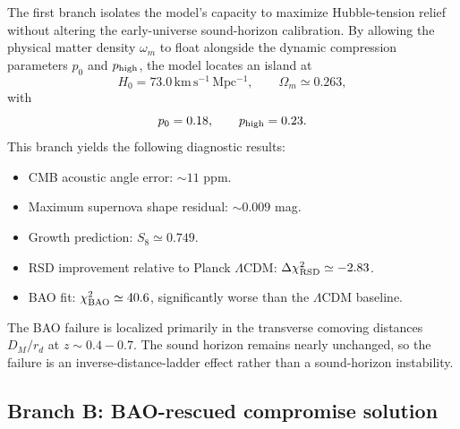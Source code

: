\documentclass[11pt,a4paper]{article}
\newcommand{\LCDM}{\ensuremath{\Lambda\mathrm{CDM}}}
\newcommand{\kmsmpc}{\ensuremath{\mathrm{km\,s^{-1}\,Mpc^{-1}}}}
\begin{document}
The first branch isolates the model's capacity to maximize Hubble-tension relief without altering the early-universe sound-horizon calibration. By allowing the physical matter density $\omega_m$ to float alongside the dynamic compression parameters $p_0$ and $p_{\rm high}$, the model locates an island at
\begin{equation}
H_0=73.0\,\kmsmpc,\qquad \Omega_m\simeq0.263,
\end{equation}
with
\begin{equation}
p_0=0.18,\qquad p_{\rm high}=0.23.
\end{equation}
This branch yields the following diagnostic results:
\begin{itemize}
\item CMB acoustic angle error: $\sim11$ ppm.
\item Maximum supernova shape residual: $\sim0.009$ mag.
\item Growth prediction: $S_8\simeq0.749$.
\item RSD improvement relative to Planck \LCDM{}: $\Delta\chi^2_{\rm RSD}\simeq-2.83$.
\item BAO fit: $\chi^2_{\rm BAO}\simeq40.6$, significantly worse than the \LCDM{} baseline.
\end{itemize}
The BAO failure is localized primarily in the transverse comoving distances $D_M/r_d$ at $z\sim0.4-0.7$. The sound horizon remains nearly unchanged, so the failure is an inverse-distance-ladder effect rather than a sound-horizon instability.

\subsection{Branch B: BAO-rescued compromise solution}
\end{document}
